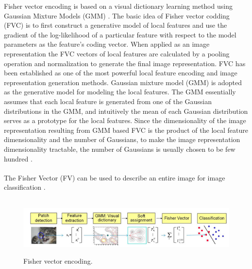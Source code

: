 \documentclass[12pt]{article}
\numberwithin{equation}{section}
\numberwithin{table}{section}
\numberwithin{figure}{section}
\begin{document}
Fisher vector encoding is based on a visual dictionary learning method using Gaussian Mixture Models (GMM) \cite{Diba}.
The basic idea of Fisher vector codding (FVC) is to first construct a generative model of local features and use the gradient of the log-likelihood of a particular feature with respect to the model parameters as the feature’s coding vector. When applied as an image representation the FVC vectors of local features are calculated by a pooling operation and normalization to generate the final image representation. FVC has been established as one of the most powerful local feature encoding and image representation generation methods. Gaussian mixture model (GMM) is adopted as the generative model for modeling the local features. The GMM essentially assumes that each local feature is generated from one of the Gaussian distributions in the GMM, and intuitively the mean of each Gaussian distribution serves as a prototype for the local features. Since the dimensionality of the image representation resulting from GMM based FVC is the product of the local feature dimensionality and the number of Gaussians, to make the image representation dimensionality tractable, the number of Gaussians is usually chosen to be few hundred \cite{Liu2016}.\\\\



\noindent
The Fisher Vector (FV) can be used to describe an entire image for image classification \cite{Sanchez2013}. \\\\

\begin{figure}[H] \centering
	\caption{ Fisher vector encoding. }
	\includegraphics[width=1\textwidth]{fisher.png}
	\label{fisher}
\end{figure}
\end{document}
